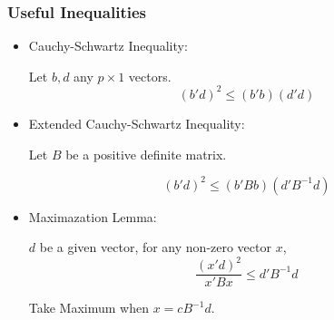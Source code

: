     \subsubsection{Useful Inequalities}
    \begin{itemize}[topsep=6pt,itemsep=4pt]
        \item Cauchy-Schwartz Inequality:
        
        Let $ b,d$ any $ p\times 1 $ vectors.
        \begin{equation}
            (b'd)^2\leq (b'b)(d'd) 
        \end{equation}
        
        \item Extended Cauchy-Schwartz Inequality: 
        
        Let $ B $ be a positive definite matrix.
        
        \begin{equation}
            (b'd)^2\leq(b'Bb)(d'B^{-1}d) 
        \end{equation}
        
        \item Maximazation Lemma:
        
        $ d $ be a given vector, for any non-zero vector $ x $,
        \begin{equation}
            \dfrac{(x'd)^2}{x'Bx}\leq d'B^{-1}d 
        \end{equation}

        Take Maximum when $ x=cB^{-1}d $.
        
        
    \end{itemize}

        

